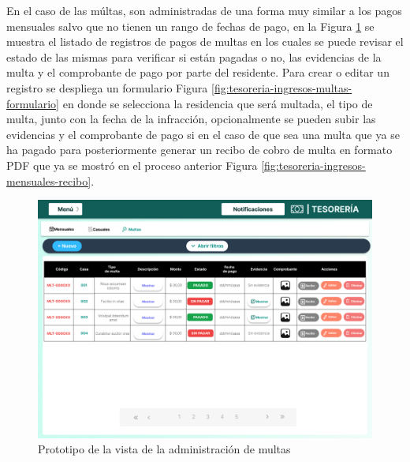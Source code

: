 En el caso de las múltas, son administradas de una forma muy similar a los pagos mensuales salvo que no tienen un rango de fechas de pago, en la Figura \ref{fig:tesoreria-ingresos-multas} se muestra el listado de registros de pagos de multas en los cuales se puede revisar el estado de las mismas para verificar si están pagadas o no, las evidencias de la multa y el comprobante de pago por parte del residente.
Para crear o editar un registro se despliega un formulario Figura \ref{fig:tesoreria-ingresos-multas-formulario} en donde se selecciona la residencia que será multada, el tipo de multa, junto con la fecha de la infracción, opcionalmente se pueden subir las evidencias y el comprobante de pago si en el caso de que sea una multa que ya se ha pagado para posteriormente generar un recibo de cobro de multa en formato PDF que ya se mostró en el proceso anterior Figura \ref{fig:tesoreria-ingresos-mensuales-recibo}.

\begin{figure}[H]
    \centering
    \includegraphics[width=1\textwidth]{resources/images/tesoreia - ingresos - multas}
    \caption{Prototipo de la vista de la administración de multas}
    \label{fig:tesoreria-ingresos-multas}
\end{figure}


